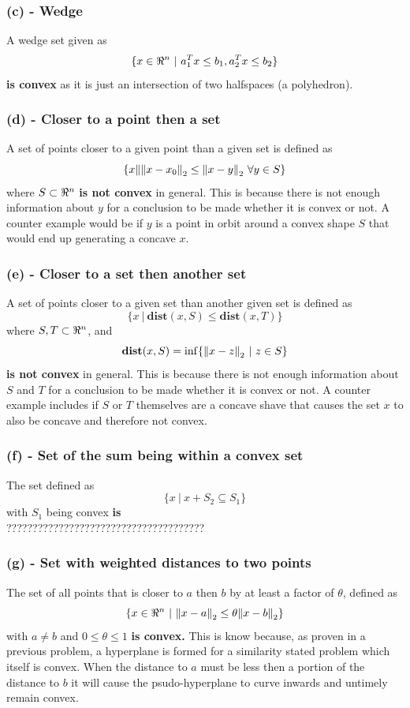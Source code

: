 \documentclass[letter]{article}
\begin{document}
\subsubsection{(c) - Wedge}
A wedge set given as $$\{x \in \real^n \ | \ a_1^T x \leq b_1, a_2^T x \leq b_2\}$$ \textbf{is convex} as it is just an intersection of two halfspaces (a polyhedron).

\subsubsection{(d) - Closer to a point then a set}
A set of points closer to a given point than a given set is defined as $$\{x \| \norm{x-x_0}_2 \leq \norm{x - y}_2 \ \forall y \in S\}$$ where $S\subset\real^n$ \textbf{is not convex} in general. This is because there is not enough information about $y$ for a conclusion to be made whether it is convex or not. A counter example would be if $y$ is a point in orbit around a convex shape $S$ that would end up generating a concave $x$.

\subsubsection{(e) - Closer to a set then another set}
A set of points closer to a given set than another given set is defined as $$\{x \ | \ \textbf{dist}(x,S) \leq \textbf{dist}(x,T)\}$$ where $S, T \subset\real^n$, and $$\textbf{dist}(x,S) = \inf\{\norm{x-z}_2 \ | \ z \in S\}$$ \textbf{is not convex} in general. This is because there is not enough information about $S$ and $T$ for a conclusion to be made whether it is convex or not. A counter example includes if $S$ or $T$ themselves are a concave shave that causes the set $x$ to also be concave and therefore not convex.


\subsubsection{(f) - Set of the sum being within a convex set}
The set defined as $$\{x \ | \ x + S_2 \subseteq S_1\}$$ with $S_1$ being convex \textbf{is }\\

??????????????????????????????????????\\

\subsubsection{(g) - Set with weighted distances to two points}
The set of all points that is closer to $a$ then $b$ by at least a factor of $\theta$, defined as $$\{x \in \real^n \ | \ \norm{x-a}_2 \leq \theta \norm{x-b}_2\}$$ with $a \neq b$ and $0 \leq \theta \leq 1$ \textbf{is convex.} This is know because, as proven in a previous problem, a hyperplane is formed for a similarity stated problem which itself is convex. When the distance to $a$ must be less then a portion of the distance to $b$ it will cause the psudo-hyperplane to curve inwards and untimely remain convex.
\end{document}
